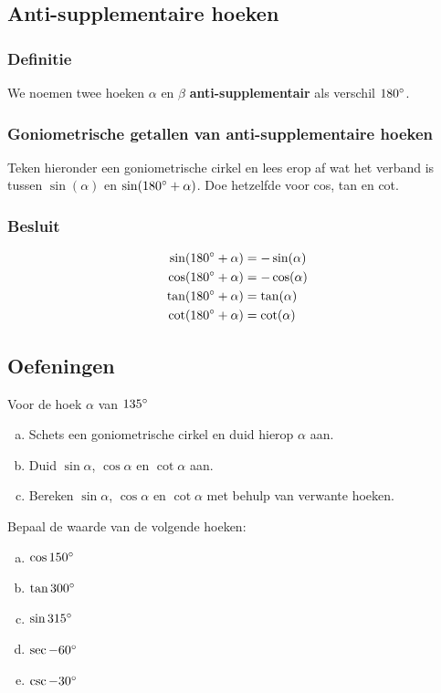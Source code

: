 \documentclass[a4paper,12pt]{article}
\begin{document}
\pagebreak
\subsection{Anti-supplementaire hoeken}

\subsubsection*{Definitie}
We noemen twee hoeken $\alpha$ en $\beta$ \textbf{anti-supplementair} als verschil $180^\circ$.

\subsubsection*{Goniometrische getallen van anti-supplementaire hoeken}
Teken hieronder een goniometrische cirkel en lees erop af wat het verband is tussen $\sin(\alpha)$ en $\sin(180^\circ+\alpha)$. Doe hetzelfde voor cos, tan en cot.
\vspace*{6cm}

\subsubsection*{Besluit}
\begin{align*}
\sin(180^\circ+\alpha)&=-\sin(\alpha)\\
\cos(180^\circ+\alpha)&=-\cos(\alpha)\\
\tan(180^\circ+\alpha)&=\tan(\alpha)\\
\cot(180^\circ+\alpha)&=\cot(\alpha)  
\end{align*}

\pagebreak
\subsection{Oefeningen}

\begin{oefening}
Voor de hoek $\alpha$ van $135^\circ$
\begin{enumerate}[(a)]
  \item Schets een goniometrische cirkel en duid hierop $\alpha$ aan.
  \item Duid $\sin \alpha$, $\cos \alpha$ en $\cot \alpha$ aan.
  \item Bereken $\sin \alpha$, $\cos \alpha$ en $\cot \alpha$ met behulp van verwante hoeken.
\end{enumerate}
\end{oefening}

\begin{oefening}
Bepaal de waarde van de volgende hoeken:
\begin{enumerate}[(a)]
  \itemsep.5em
  \item $\cos 150^\circ$
  \item $\tan 300^\circ$
  \item $\sin 315^\circ$
  \item $\sec -60^\circ$
  \item $\csc -30^\circ$
\end{enumerate}
\end{oefening}
\end{document}

